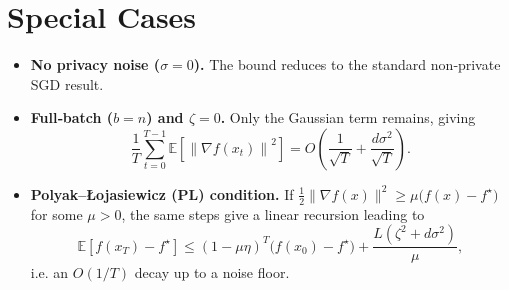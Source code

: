 \documentclass{article}
\newcommand{\E}{\mathbb{E}}
\newcommand{\norm}[1]{\left\|#1\right\|}
\begin{document}
\section*{Special Cases}
\begin{itemize}
\item \textbf{No privacy noise ($\sigma=0$).} The bound reduces to the standard non‑private SGD result.
\item \textbf{Full‑batch ($b=n$) and $\zeta=0$.} Only the Gaussian term remains, giving
\[
\frac{1}{T}\sum_{t=0}^{T-1}\E\!\left[\norm{\nabla f(x_{t})}^{2}\right]
=O\!\left(\frac{1}{\sqrt{T}}+ \frac{d\sigma^{2}}{\sqrt{T}}\right).
\]
\item \textbf{Polyak–Łojasiewicz (PL) condition.} If $\frac12\|\nabla f(x)\|^{2}\ge \mu\bigl(f(x)-f^{\star}\bigr)$ for some $\mu>0$, the same steps give a linear recursion leading to
\[
\E\!\left[f(x_{T})-f^{\star}\right]\le (1-\mu\eta)^{T}\bigl(f(x_{0})-f^{\star}\bigr)+\frac{L(\zeta^{2}+d\sigma^{2})}{\mu},
\]
i.e. an $O(1/T)$ decay up to a noise floor.
\end{itemize}
\end{document}

